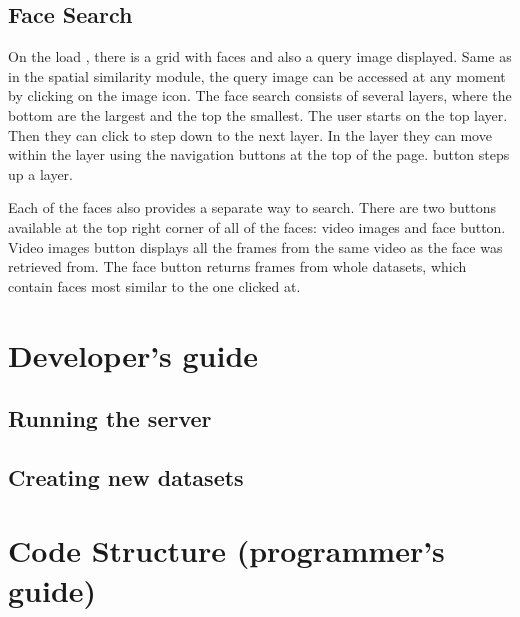 \section{Face Search}

On the load , there is a grid with faces and also a query image displayed. Same as in the spatial similarity module, the query image can be accessed at any moment by clicking on the image icon. The face search consists of several layers, where the bottom are the largest and the top the smallest. The user starts on the top layer. Then they can click to step down to the next layer. In the layer they can move within the layer using the navigation buttons at the top of the page.  button steps up a layer.

Each of the faces also provides a separate way to search. There are two buttons available at the top right corner of all of the faces: video images and face button. Video images button displays all the frames from the same video as the face was retrieved from. The face button returns frames from whole datasets, which contain faces most similar to the one clicked at.

\chapter{Developer's guide}
\label{ch:developers_guide}

\cite{pedregosa2011scikit}
\cite{van2011numpy}

\section{Running the server}

\section{Creating new datasets}



\chapter{Code Structure (programmer's guide)}
\label{ch:programmers_guide}


